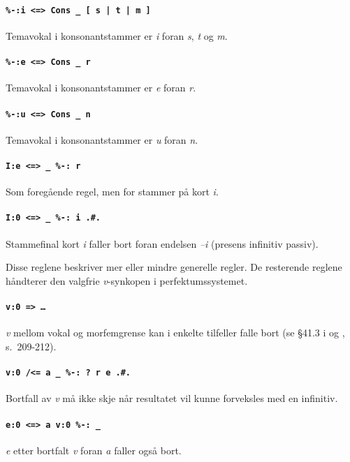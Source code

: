 \documentclass{article}
\begin{document}
\paragraph{\texttt{\%-:i <=> Cons \_ [ s | t | m ]}} Temavokal i
konsonantstammer er \emph{i} foran \emph{s}, \emph{t} og \emph{m}.

\paragraph{\texttt{\%-:e <=> Cons \_ r}} Temavokal i konsonantstammer er
\emph{e} foran \emph{r}.

\paragraph{\texttt{\%-:u <=> Cons \_ n}} Temavokal i konsonantstammer er
\emph{u} foran \emph{n}.

\paragraph{\texttt{I:e <=> \_ \%-: r}} Som foreg\aa{}ende regel, men for
stammer p\aa{} kort \emph{i}.

\paragraph{\texttt{I:0 <=> \_ \%-: i .\#.}} Stammefinal kort \emph{i} faller
bort foran endelsen \emph{--i} (presens infinitiv passiv).

Disse reglene beskriver mer eller mindre generelle regler. De resterende
reglene h\aa{}ndterer den valgfrie \emph{v}-synkopen i perfektumssystemet.

\paragraph{\texttt{v:0 => \ldots}} \emph{v} mellom vokal og morfemgrense kan i
enkelte tilfeller falle bort (se \S 41.3 i  og ,
s.~209-212).

\paragraph{\texttt{v:0 /<= a \_ \%-: ? r e .\#.}} Bortfall av \emph{v} m\aa{}
ikke skje n\aa{}r resultatet vil kunne forveksles med en infinitiv.

\paragraph{\texttt{e:0 <=> a v:0 \%-: \_}} \emph{e} etter bortfalt \emph{v}
foran \emph{a} faller ogs\aa{} bort.
\end{document}

